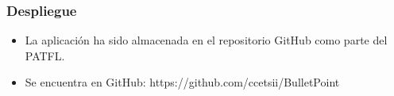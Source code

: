 \begin{frame}
  \frametitle{Despliegue}
    \begin{itemize}
		\item La aplicación ha sido almacenada en el repositorio GitHub como parte del PATFL.
    \item Se encuentra en GitHub: https://github.com/ccetsii/BulletPoint 
    \end{itemize}
  \endblock{}
\end{frame}
